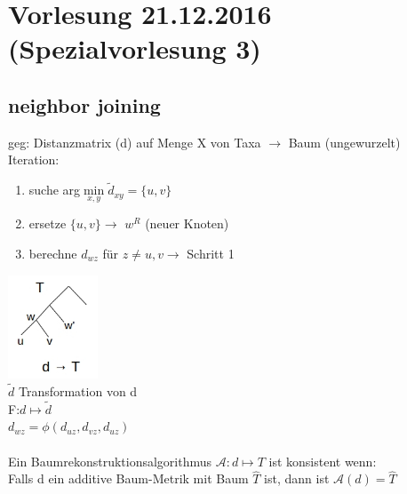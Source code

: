 \section{Vorlesung 21.12.2016 (Spezialvorlesung 3)}
\subsection{neighbor joining}
geg: Distanzmatrix (d) auf Menge X von Taxa $\rightarrow$ Baum (ungewurzelt)\\
Iteration:
\begin{enumerate}
	\item suche arg$\min \limits_{x,y} \tilde d_{xy}=\{u,v\}$
	\item ersetze $\{u,v\} \rightarrow$ $w^R$ (neuer Knoten)
	\item berechne $d_{wz}$ für $z \neq u,v \rightarrow$ Schritt 1
\end{enumerate}
\includegraphics[width=0.2\textwidth]{lectures/161221/pix/1.jpg}\\
$\tilde d$ Transformation von d\\
F:$d \mapsto \tilde d$\\
$d_{wz}=\phi(d_{uz}, d_{vz}, d_{uz})$
\\\\
Ein Baumrekonstruktionsalgorithmus $\mathcal{A}:d \mapsto T$ ist konsistent wenn:\\
Falls d ein additive Baum-Metrik mit Baum $\hat T$ ist, dann ist $\mathcal{A}(d)=\hat T$

